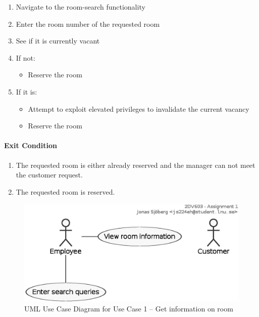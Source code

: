 \begin{enumerate}
\def\labelenumi{\arabic{enumi}.}
\tightlist
\item
  Navigate to the room-search functionality
\item
  Enter the room number of the requested room
\item
  See if it is currently vacant
\item
  If not:

  \begin{itemize}
  \tightlist
  \item
    Reserve the room
  \end{itemize}
\item
  If it is:

  \begin{itemize}
  \tightlist
  \item
    Attempt to exploit elevated privileges to invalidate the current
    vacancy
  \item
    Reserve the room
  \end{itemize}
\end{enumerate}

\paragraph{Exit Condition}

\begin{enumerate}
\def\labelenumi{\arabic{enumi}.}
\tightlist
\item
  The requested room is either already reserved and the manager can not
  meet the customer request.
\item
  The requested room is reserved.
\end{enumerate}




\begin{figure}[htbp]
  \centering
  \includegraphics[width=0.8\linewidth]{include/usecase1.eps}
  \caption{UML Use Case Diagram for Use Case 1 -- Get information on room}
  \label{fig:uml-usecase1}
\end{figure}

